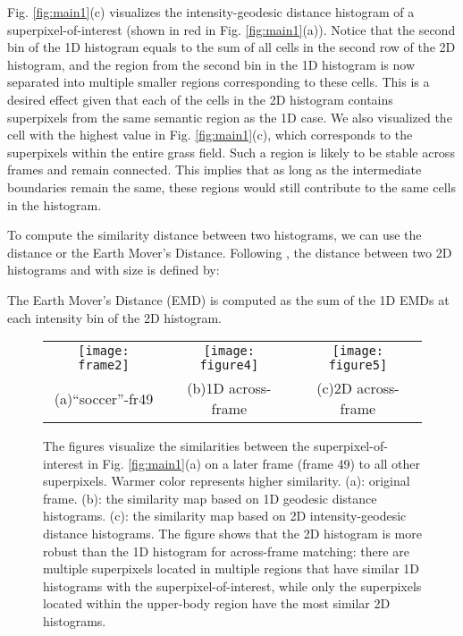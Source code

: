 \documentclass[runningheads]{llncs}
\begin{document}
Fig. \ref{fig:main1}(c) visualizes the intensity-geodesic distance histogram of a superpixel-of-interest (shown in red in Fig. \ref{fig:main1}(a)). Notice that the second bin of the 1D histogram equals to the sum of all cells in the second row of the 2D histogram, and the region from the second bin in the 1D histogram is now separated into multiple smaller regions corresponding to these cells. This is a desired effect given that each of the cells in the 2D histogram  contains superpixels from the same semantic region as the 1D case. We also visualized the cell with the highest value in Fig. \ref{fig:main1}(c), which corresponds to the superpixels within the entire grass field. Such a region is likely to be stable across frames and remain connected. This implies that as long as the intermediate boundaries remain the same, these regions would still contribute to the same cells in the histogram.

To compute the similarity distance between two histograms, we can use the  distance or the Earth Mover's Distance. Following \cite{geohis}, the   distance between two 2D histograms  and  with size  is  defined by:


The Earth Mover's Distance (EMD) is computed as the sum of the 1D EMDs at each intensity bin of the 2D histogram.

\begin{figure}[!t]
\begin{center}
\begin{adjustbox}{max width=0.9\textwidth}
\begin{tabular}{ccc}
\texttt{[image: frame2]}&
\texttt{[image: figure4]}&
\texttt{[image: figure5]}\\
(a)``soccer''-fr49&(b)1D across-frame&(c)2D across-frame\\
\end{tabular}
\end{adjustbox}
\end{center}
\caption{The figures visualize the similarities between the superpixel-of-interest in Fig. \ref{fig:main1}(a) on a later frame (frame 49) to all other superpixels. Warmer color represents higher similarity. (a): original frame. (b): the similarity map based on 1D geodesic distance histograms. (c): the similarity map based on 2D intensity-geodesic distance histograms. The figure shows that the 2D histogram is more robust than the 1D histogram for across-frame matching: there are multiple superpixels located in multiple regions that have similar 1D histograms with the superpixel-of-interest, while only the superpixels located within the upper-body region have the most similar 2D histograms.}
\label{fig:betweenfr}
\end{figure}
\end{document}
